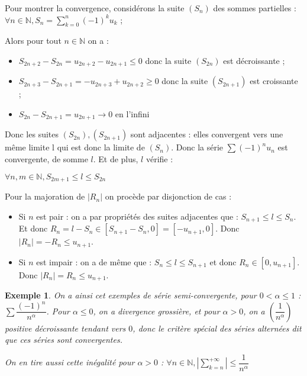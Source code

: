 \documentclass[a4paper,12pt]{book}
\newcommand{\Pre}[1]{\begin{tcolorbox}[sharp corners, colback=white,colframe=green!60!green!30!black!75, title=Preuve]#1\end{tcolorbox}}
\newtheorem{Exe}{Exemple}[section]
\def\N{\mathbb{N}}
\begin{document}
\Pre{Pour montrer la convergence, considérons la suite $(S_n)$ des sommes partielles : $\forall n\in\N, S_n = \sum\limits_{k=0}^n (-1)^ku_k$ ;
\par Alors pour tout $n\in\N$ on a :\begin{itemize}
\item $S_{2n+2}-S_{2n} = u_{2n+2}-u_{2n+1} \leq0$ donc la suite $(S_{2n})$ est décroissante ;
\item $S_{2n+3}-S_{2n+1} = -u_{2n+3} + u_{2n+2}\geq 0$ donc la suite $(S_{2n+1})$ est croissante ;
\item $S_{2n} - S_{2n+1} = u_{2n+1}\to0$ en l'infini\end{itemize}
Donc les suites $(S_{2n}), (S_{2n+1})$ sont adjacentes : elles convergent vers une même limite l qui est donc la limite de $(S_n)$. Donc la série $\sum (-1)^nu_n$ est convergente, de somme $l$. Et de plus, $l$ vérifie :
\par $\forall n,m\in\N, S_{2m+1}\leq l\leq S_{2n}$
\par Pour la majoration de $\vert R_n\vert$ on procède par disjonction de cas :\begin{itemize}
\item Si $n$ est pair : on a par propriétés des suites adjacentes que : $S_{n+1}\leq l\leq S_n$. Et donc $R_n = l-S_n\in [S_{n+1} - S_n, 0] = [-u_{n+1}, 0]$. Donc $\vert R_n\vert = -R_n \leq u_{n+1}$.
\item Si $n$ est impair : on a de même que : $S_n\leq l\leq S_{n+1}$ et donc $R_n\in[0, u_{n+1}]$. Donc $\vert R_n\vert = R_n \leq u_{n+1}$.
\end{itemize}
}

\begin{Exe}
On a ainsi cet exemples de série semi-convergente, pour $0<\alpha\leq1$ : $\sum \dfrac{(-1)^n}{n^\alpha}$. Pour $\alpha\leq 0$, on a divergence grossière, et pour $\alpha>0$, on a $(\dfrac{1}{n^\alpha})$ positive décroissante tendant vers $0$, donc le critère spécial des séries alternées dit que ces séries sont convergentes.
\par On en tire aussi cette inégalité pour $\alpha>0$ : $\forall n\in\N, \left|\sum_{k=n}^{+\infty}\right|\leq \dfrac{1}{n^\alpha}$
\end{Exe}
\end{document}
